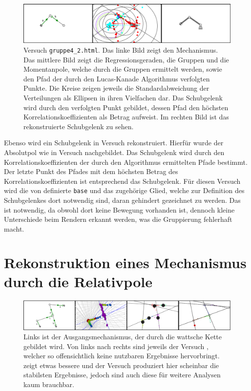 \begin{figure}
    \includegraphics[width=\textwidth]{gfx/gruppe4_2.png}
    \caption[Versuch \lstinline{gruppe4_2.html}]{Versuch \lstinline{gruppe4_2.html}. Das linke Bild zeigt den Mechanismus. Das mittlere Bild zeigt die Regressionsgeraden, die Gruppen und die Momentanpole, welche durch die Gruppen ermittelt werden, sowie den Pfad der durch den Lucas-Kanade Algorithmus verfolgten Punkte. Die Kreise zeigen jeweils die Standardabweichung der Verteilungen als Ellipsen in ihren Vielfachen dar.
    Das Schubgelenk wird durch den verfolgten Punkt gebildet, dessen Pfad den höchsten Korrelationskoeffizienten als Betrag aufweist. Im rechten Bild ist das rekonstruierte Schubgelenk zu sehen.}
    \label{fig:gruppe4_2}
\end{figure}

Ebenso wird ein Schubgelenk in Versuch  rekonstruiert.
Hierfür wurde der Absolutpol wie in Versuch  nachgebildet.
Das Schubgelenk wird durch den Korrelationskoeffizienten der durch den  Algorithmus ermittelten Pfade bestimmt.
Der letzte Punkt des Pfades mit dem höchsten Betrag des Korrelationskoeffizienten ist entsprechend das Schubgelenk.
Für diesen Versuch wird die von  definierte \lstinline{base} und das zugehörige Glied, welche zur Definition des Schubgelenkes dort notwendig sind, daran gehindert gezeichnet zu werden.
Das ist notwendig, da obwohl dort keine Bewegung vorhanden ist, dennoch kleine Unterschiede beim Rendern erkannt werden, was die Gruppierung fehlerhaft macht.

\section{Rekonstruktion eines Mechanismus durch die Relativpole}

\begin{figure}
    \includegraphics[width=\textwidth]{gfx/gruppe_failed_edit.png}
    \caption[Versuche ,  und .]{Links ist der Ausgangsmechanismus, der durch die wattsche Kette gebildet wird. Von links nach rechts sind jeweils der Versuch , welcher so offensichtlich keine nutzbaren Ergebnisse hervorbringt.  zeigt etwas bessere und der Versuch  produziert hier scheinbar die stabilsten Ergebnisse, jedoch sind auch diese für weitere Analysen kaum brauchbar.}
    \label{fig:gruppe1_3_2_6_3_4}
\end{figure}

